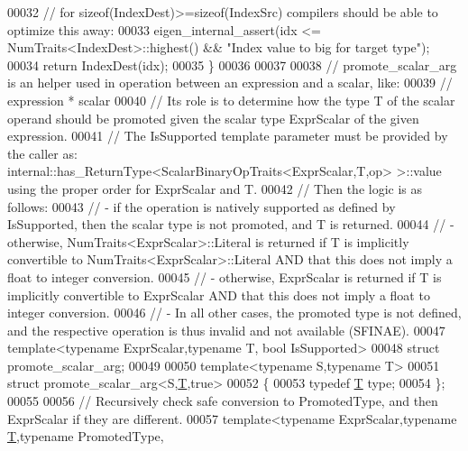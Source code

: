 \begin{DoxyCode}
00032   \textcolor{comment}{// for sizeof(IndexDest)>=sizeof(IndexSrc) compilers should be able to optimize this away:}
00033   eigen\_internal\_assert(idx <= NumTraits<IndexDest>::highest() && \textcolor{stringliteral}{"Index value to big for target type"});
00034   \textcolor{keywordflow}{return} IndexDest(idx);
00035 \}
00036 
00037 
00038 \textcolor{comment}{// promote\_scalar\_arg is an helper used in operation between an expression and a scalar, like:}
00039 \textcolor{comment}{//    expression * scalar}
00040 \textcolor{comment}{// Its role is to determine how the type T of the scalar operand should be promoted given the scalar type
       ExprScalar of the given expression.}
00041 \textcolor{comment}{// The IsSupported template parameter must be provided by the caller as:
       internal::has\_ReturnType<ScalarBinaryOpTraits<ExprScalar,T,op> >::value using the proper order for ExprScalar and T.}
00042 \textcolor{comment}{// Then the logic is as follows:}
00043 \textcolor{comment}{//  - if the operation is natively supported as defined by IsSupported, then the scalar type is not
       promoted, and T is returned.}
00044 \textcolor{comment}{//  - otherwise, NumTraits<ExprScalar>::Literal is returned if T is implicitly convertible to
       NumTraits<ExprScalar>::Literal AND that this does not imply a float to integer conversion.}
00045 \textcolor{comment}{//  - otherwise, ExprScalar is returned if T is implicitly convertible to ExprScalar AND that this does not
       imply a float to integer conversion.}
00046 \textcolor{comment}{//  - In all other cases, the promoted type is not defined, and the respective operation is thus invalid
       and not available (SFINAE).}
00047 \textcolor{keyword}{template}<\textcolor{keyword}{typename} ExprScalar,\textcolor{keyword}{typename} T, \textcolor{keywordtype}{bool} IsSupported>
00048 \textcolor{keyword}{struct }promote\_scalar\_arg;
00049 
00050 \textcolor{keyword}{template}<\textcolor{keyword}{typename} S,\textcolor{keyword}{typename} T>
00051 \textcolor{keyword}{struct }promote\_scalar\_arg<S,\hyperlink{group___sparse_core___module_class_eigen_1_1_triplet}{T},true>
00052 \{
00053   \textcolor{keyword}{typedef} \hyperlink{group___sparse_core___module_class_eigen_1_1_triplet}{T} type;
00054 \};
00055 
00056 \textcolor{comment}{// Recursively check safe conversion to PromotedType, and then ExprScalar if they are different.}
00057 \textcolor{keyword}{template}<\textcolor{keyword}{typename} ExprScalar,\textcolor{keyword}{typename} \hyperlink{group___sparse_core___module_class_eigen_1_1_triplet}{T},\textcolor{keyword}{typename} PromotedType,

\end{DoxyCode}
